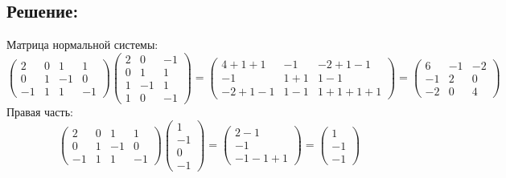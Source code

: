 \documentclass[12pt]{article}
\begin{document}
    \subsection*{Решение:}
    Матрица нормальной системы:
    \[
        \begin{pmatrix}
            2  & 0 & 1  & 1  \\
            0  & 1 & -1 & 0  \\
            -1 & 1 & 1  & -1
        \end{pmatrix}
        \begin{pmatrix}
            2 & 0  & -1 \\
            0 & 1  & 1  \\
            1 & -1 & 1  \\
            1 & 0  & -1
        \end{pmatrix}
        =
        \begin{pmatrix}
            4 + 1 + 1 & -1    & -2 + 1 -1     \\
            -1        & 1 + 1 & 1 - 1         \\
            -2 + 1 -1 & 1 - 1 & 1 + 1 + 1 + 1
        \end{pmatrix}
        =
        \begin{pmatrix}
            6  & -1 & -2 \\
            -1 & 2  & 0  \\
            -2 & 0  & 4
        \end{pmatrix}
    \]
    Правая часть:
    \[
        \begin{pmatrix}
            2  & 0 & 1  & 1  \\
            0  & 1 & -1 & 0  \\
            -1 & 1 & 1  & -1
        \end{pmatrix}
        \begin{pmatrix}
            1  \\
            -1 \\
            0  \\
            -1
        \end{pmatrix}
        =
        \begin{pmatrix}
            2 - 1 \\
            -1    \\
            -1 -1 + 1
        \end{pmatrix}
        =
        \begin{pmatrix}
            1  \\
            -1 \\
            -1
        \end{pmatrix}
    \]
\end{document}
